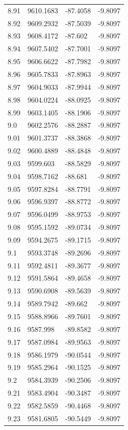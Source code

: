 \begin{table}[H]
\begin{tabular}{llll}
8.91 & 9610.1683 & -87.4058 & -9.8097 \\
8.92 & 9609.2932 & -87.5039 & -9.8097 \\
8.93 & 9608.4172 & -87.602 & -9.8097 \\
8.94 & 9607.5402 & -87.7001 & -9.8097 \\
8.95 & 9606.6622 & -87.7982 & -9.8097 \\
8.96 & 9605.7833 & -87.8963 & -9.8097 \\
8.97 & 9604.9033 & -87.9944 & -9.8097 \\
8.98 & 9604.0224 & -88.0925 & -9.8097 \\
8.99 & 9603.1405 & -88.1906 & -9.8097 \\
9.0 & 9602.2576 & -88.2887 & -9.8097 \\
9.01 & 9601.3737 & -88.3868 & -9.8097 \\
9.02 & 9600.4889 & -88.4848 & -9.8097 \\
9.03 & 9599.603 & -88.5829 & -9.8097 \\
9.04 & 9598.7162 & -88.681 & -9.8097 \\
9.05 & 9597.8284 & -88.7791 & -9.8097 \\
9.06 & 9596.9397 & -88.8772 & -9.8097 \\
9.07 & 9596.0499 & -88.9753 & -9.8097 \\
9.08 & 9595.1592 & -89.0734 & -9.8097 \\
9.09 & 9594.2675 & -89.1715 & -9.8097 \\
9.1 & 9593.3748 & -89.2696 & -9.8097 \\
9.11 & 9592.4811 & -89.3677 & -9.8097 \\
9.12 & 9591.5864 & -89.4658 & -9.8097 \\
9.13 & 9590.6908 & -89.5639 & -9.8097 \\
9.14 & 9589.7942 & -89.662 & -9.8097 \\
9.15 & 9588.8966 & -89.7601 & -9.8097 \\
9.16 & 9587.998 & -89.8582 & -9.8097 \\
9.17 & 9587.0984 & -89.9563 & -9.8097 \\
9.18 & 9586.1979 & -90.0544 & -9.8097 \\
9.19 & 9585.2964 & -90.1525 & -9.8097 \\
9.2 & 9584.3939 & -90.2506 & -9.8097 \\
9.21 & 9583.4904 & -90.3487 & -9.8097 \\
9.22 & 9582.5859 & -90.4468 & -9.8097 \\
9.23 & 9581.6805 & -90.5449 & -9.8097 \\

\end{tabular}
\end{table}
